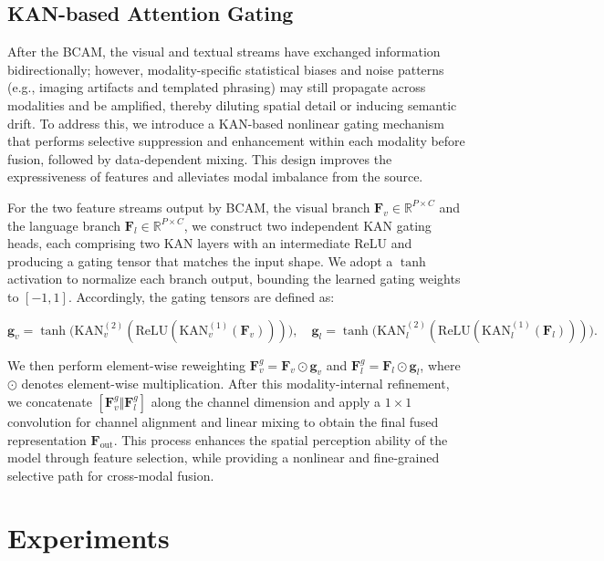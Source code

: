 \documentclass{article} %
\begin{document}
\subsection{KAN-based Attention Gating}

After the BCAM, the visual and textual streams have exchanged information bidirectionally; however, modality-specific statistical biases and noise patterns (e.g., imaging artifacts and templated phrasing) may still propagate across modalities and be amplified, thereby diluting spatial detail or inducing semantic drift. To address this, we introduce a KAN-based nonlinear gating mechanism that performs selective suppression and enhancement within each modality before fusion, followed by data-dependent mixing. This design improves the expressiveness of features and alleviates modal imbalance from the source.

For the two feature streams output by BCAM, the visual branch $\mathbf F_v\in\mathbb{R}^{P\times C}$ and the language branch $\mathbf F_l\in\mathbb{R}^{P\times C}$, we construct two independent KAN gating heads, each comprising two KAN layers with an intermediate ReLU and producing a gating tensor that matches the input shape. We adopt a $\tanh$ activation to normalize each branch output, bounding the learned gating weights to $[-1,1]$. Accordingly, the gating tensors are defined as:

\begin{equation}
\mathbf g_v=\tanh\!\big(\mathrm{KAN}^{(2)}_v(\mathrm{ReLU}(\mathrm{KAN}^{(1)}_v(\mathbf F_v)))\big),\quad
\mathbf g_l=\tanh\!\big(\mathrm{KAN}^{(2)}_l(\mathrm{ReLU}(\mathrm{KAN}^{(1)}_l(\mathbf F_l)))\big).
\end{equation}

We then perform element-wise reweighting $\mathbf F_v^{g}=\mathbf F_v\odot\mathbf g_v$ and $\mathbf F_l^{g}=\mathbf F_l\odot\mathbf g_l$, where $\odot$ denotes element-wise multiplication. After this modality-internal refinement, we concatenate $[\mathbf F_v^{g}\Vert \mathbf F_l^{g}]$ along the channel dimension and apply a $1\times 1$ convolution for channel alignment and linear mixing to obtain the final fused representation $\mathbf F_{\text{out}}$. This process enhances the spatial perception ability of the model through feature selection, while providing a nonlinear and fine-grained selective path for cross-modal fusion.

\section{Experiments}
\end{document}
